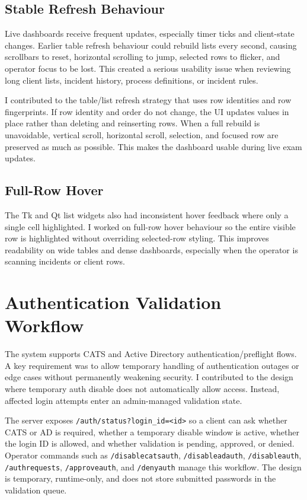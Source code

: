 \documentclass[conference]{IEEEtran}
\begin{document}
\subsection{Stable Refresh Behaviour}

Live dashboards receive frequent updates, especially timer ticks and client-state changes. Earlier table refresh behaviour could rebuild lists every second, causing scrollbars to reset, horizontal scrolling to jump, selected rows to flicker, and operator focus to be lost. This created a serious usability issue when reviewing long client lists, incident history, process definitions, or incident rules.

I contributed to the table/list refresh strategy that uses row identities and row fingerprints. If row identity and order do not change, the UI updates values in place rather than deleting and reinserting rows. When a full rebuild is unavoidable, vertical scroll, horizontal scroll, selection, and focused row are preserved as much as possible. This makes the dashboard usable during live exam updates.

\subsection{Full-Row Hover}

The Tk and Qt list widgets also had inconsistent hover feedback where only a single cell highlighted. I worked on full-row hover behaviour so the entire visible row is highlighted without overriding selected-row styling. This improves readability on wide tables and dense dashboards, especially when the operator is scanning incidents or client rows.

\section{Authentication Validation Workflow}

The system supports CATS and Active Directory authentication/preflight flows. A key requirement was to allow temporary handling of authentication outages or edge cases without permanently weakening security. I contributed to the design where temporary auth disable does not automatically allow access. Instead, affected login attempts enter an admin-managed validation state.

The server exposes \texttt{/auth/status?login\_id=<id>} so a client can ask whether CATS or AD is required, whether a temporary disable window is active, whether the login ID is allowed, and whether validation is pending, approved, or denied. Operator commands such as \texttt{/disablecatsauth}, \texttt{/disableadauth}, \texttt{/disableauth}, \texttt{/authrequests}, \texttt{/approveauth}, and \texttt{/denyauth} manage this workflow. The design is temporary, runtime-only, and does not store submitted passwords in the validation queue.
\end{document}
